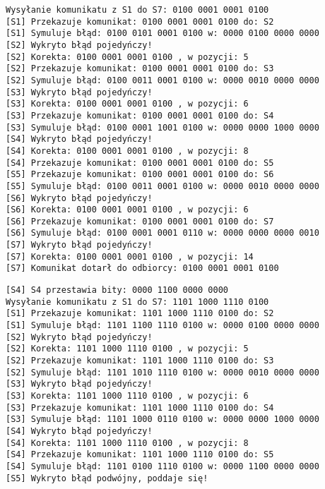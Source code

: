 \begin{empty}
	\begin{verbatim}
Wysyłanie komunikatu z S1 do S7: 0100 0001 0001 0100
[S1] Przekazuje komunikat: 0100 0001 0001 0100 do: S2
[S1] Symuluje błąd: 0100 0101 0001 0100 w: 0000 0100 0000 0000
[S2] Wykryto błąd pojedyńczy!
[S2] Korekta: 0100 0001 0001 0100 , w pozycji: 5
[S2] Przekazuje komunikat: 0100 0001 0001 0100 do: S3
[S2] Symuluje błąd: 0100 0011 0001 0100 w: 0000 0010 0000 0000
[S3] Wykryto błąd pojedyńczy!
[S3] Korekta: 0100 0001 0001 0100 , w pozycji: 6
[S3] Przekazuje komunikat: 0100 0001 0001 0100 do: S4
[S3] Symuluje błąd: 0100 0001 1001 0100 w: 0000 0000 1000 0000
[S4] Wykryto błąd pojedyńczy!
[S4] Korekta: 0100 0001 0001 0100 , w pozycji: 8
[S4] Przekazuje komunikat: 0100 0001 0001 0100 do: S5
[S5] Przekazuje komunikat: 0100 0001 0001 0100 do: S6
[S5] Symuluje błąd: 0100 0011 0001 0100 w: 0000 0010 0000 0000
[S6] Wykryto błąd pojedyńczy!
[S6] Korekta: 0100 0001 0001 0100 , w pozycji: 6
[S6] Przekazuje komunikat: 0100 0001 0001 0100 do: S7
[S6] Symuluje błąd: 0100 0001 0001 0110 w: 0000 0000 0000 0010
[S7] Wykryto błąd pojedyńczy!
[S7] Korekta: 0100 0001 0001 0100 , w pozycji: 14
[S7] Komunikat dotarł do odbiorcy: 0100 0001 0001 0100
	\end{verbatim}
	\vspace{-10pt}
\end{empty}

\newpage
\begin{empty}
	\begin{verbatim}
[S4] S4 przestawia bity: 0000 1100 0000 0000
Wysyłanie komunikatu z S1 do S7: 1101 1000 1110 0100
[S1] Przekazuje komunikat: 1101 1000 1110 0100 do: S2
[S1] Symuluje błąd: 1101 1100 1110 0100 w: 0000 0100 0000 0000
[S2] Wykryto błąd pojedyńczy!
[S2] Korekta: 1101 1000 1110 0100 , w pozycji: 5
[S2] Przekazuje komunikat: 1101 1000 1110 0100 do: S3
[S2] Symuluje błąd: 1101 1010 1110 0100 w: 0000 0010 0000 0000
[S3] Wykryto błąd pojedyńczy!
[S3] Korekta: 1101 1000 1110 0100 , w pozycji: 6
[S3] Przekazuje komunikat: 1101 1000 1110 0100 do: S4
[S3] Symuluje błąd: 1101 1000 0110 0100 w: 0000 0000 1000 0000
[S4] Wykryto błąd pojedyńczy!
[S4] Korekta: 1101 1000 1110 0100 , w pozycji: 8
[S4] Przekazuje komunikat: 1101 1000 1110 0100 do: S5
[S4] Symuluje błąd: 1101 0100 1110 0100 w: 0000 1100 0000 0000
[S5] Wykryto błąd podwójny, poddaje się!
	\end{verbatim}
	\vspace{-10pt}
\end{empty}


